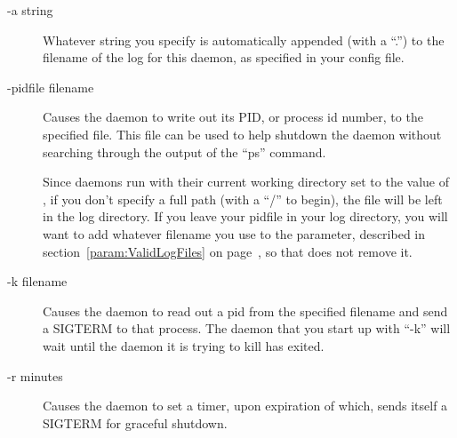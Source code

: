 \begin{description}
\item[-a string] Whatever string you specify is automatically
  appended (with a ``.'') to the filename of the log for this daemon,
  as specified in your config file.

\item[-pidfile filename] Causes the daemon to write out its PID, or
  process id number, to the specified file.  This file can be used to
  help shutdown the daemon without searching through the output of the
  ``ps'' command.

  Since daemons run with their current working directory set to the
  value of , if you don't specify a full path (with a ``/''
  to begin), the file will be left in the log directory.  If you leave
  your pidfile in your log directory, you will want to add whatever
  filename you use to the  parameter,
  described in section~\ref{param:ValidLogFiles} on
  page~\pageref{param:ValidLogFiles}, so that  does not
  remove it.

\item[-k filename] Causes the daemon to read out a pid from the
  specified filename and send a SIGTERM to that process.  The daemon
  that you start up with ``-k'' will wait until the daemon it is
  trying to kill has exited.  

\item[-r minutes] Causes the daemon to set a timer, upon expiration
  of which, sends itself a SIGTERM for graceful shutdown.

\end{description}

